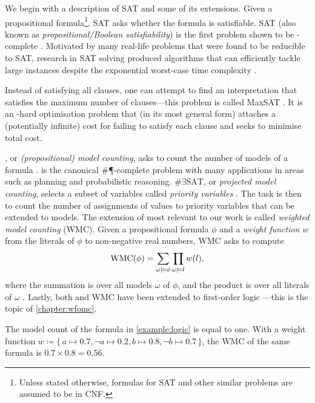 We begin with a description of SAT and some of its extensions. Given a
propositional formula\footnote{Unless stated otherwise, formulas for SAT and
  other similar problems are assumed to be in CNF.}, SAT asks whether the
formula is satisfiable. SAT (also known as \emph{propositional/Boolean
  satisfiability}) is the first problem shown to be \NP-complete
\citep{DBLP:conf/stoc/Cook71,levin1973universal}. Motivated by many real-life
problems that were found to be reducible to SAT, research in SAT solving
produced algorithms that can efficiently tackle large instances despite the
exponential worst-case time complexity \citep{DBLP:series/faia/2009-185}.

Instead of satisfying all clauses, one can attempt to find an interpretation
that satisfies the maximum number of clauses---this problem is called MaxSAT
\citep{bacchus2021maximum,DBLP:series/faia/LiM09}. It is an \NP-hard
optimisation problem that (in its most general form) attaches a (potentially
infinite) cost for failing to satisfy each clause and seeks to minimise total
cost.

\mc{}, or \emph{(propositional) model counting}, asks to count the number of
models of a formula \citep{DBLP:series/faia/GomesSS09}. \mc{} is the canonical
\#\P-complete problem with many applications in areas such as planning and
probabilistic reasoning. $\#\exists\textrm{SAT}$, or \emph{projected model
  counting}, selects a subset of variables called \emph{priority variables}
\citep{DBLP:conf/sat/AzizCMS15}. The task is then to count the number of
assignments of values to priority variables that can be extended to models. The
extension of \mc{} most relevant to our work is called \emph{weighted model
  counting} (WMC). Given a propositional formula $\phi$ and a \emph{weight
  function} $w$ from the literals of $\phi$ to non-negative real numbers, WMC
asks to compute
\[
\operatorname{WMC}(\phi) = \sum_{\omega \models \phi} \prod_{\omega \models l} w(l),
\]
where the summation is over all models $\omega$ of $\phi$, and the product is
over all literals of $\omega$ \citep{DBLP:journals/ai/ChaviraD08}. Lastly, both
\mc{} and WMC have been extended to first-order logic
\citep{DBLP:conf/ijcai/BroeckTMDR11}---this is the topic of
\cref{chapter:wfomc}.

\begin{example}\label{example:wmc1}
  The model count of the formula in \cref{example:logic} is equal to one. With a
  weight function
  $w \coloneqq \{\, a \mapsto 0.7, \neg a \mapsto 0.2, b \mapsto 0.8, \neg b \mapsto 0.7 \,\}$,
  the WMC of the same formula is $0.7 \times 0.8 = 0.56$.
\end{example}

